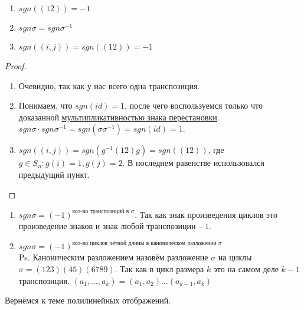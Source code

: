 \begin{statement}\leavevmode
    \begin{enumerate}
        \item $sgn\left((12)\right) = -1$
        \item $sgn\sigma = sgn\sigma^{-1}$    
        \item $sgn\left((i,j)\right) = sgn\left((12)\right) = -1$
    \end{enumerate}
\end{statement}
\begin{proof}\leavevmode
    \begin{enumerate}
        \item Очевидно, так как у нас всего одна транспозиция.
        \item 
            Понимаем, что $sgn(id) = 1$, после чего воспользуемся только что доказанной 
            \hyperref[thm:Мультипликативность знака перестановки]{мультипликативностью знака перестановки}.
            $sgn\sigma\cdot sgn\sigma^{-1} = sgn(\sigma\sigma^{-1}) = sgn(id) = 1$.
        \item
        $sgn\left((i,j)\right) = sgn\left(g^{-1}(12)g\right) = sgn\left((12)\right)$, где $g\in S_n\colon g(i) = 1, g(j) = 2$.
        В последнем равенстве использовался предыдущий пункт.

    \end{enumerate}
\end{proof}
\begin{follow}\leavevmode
    \begin{enumerate}
        \item
            $sgn\sigma = (-1)^{\text{кол-во транспозиций в $\sigma$}}$.
            Так как знак произведения циклов это произведение знаков и знак любой транспозиции $-1$.
        \item
            $sgn\sigma = (-1)^{\text{кол-во циклов чётной длины в каноническом разложении $\sigma$}}$\\
            Ps. Каноническим разложением назовём разложение $\sigma$ на циклы 
            $\sigma =(123)(45)(6789)$.
            Так как в цикл размера $k$ это на самом деле $k - 1$ транспозиция.
            $(a_1,\dots, a_k) = (a_1,a_2)\dots(a_{k-1},a_k)$\\
    \end{enumerate}
\end{follow}
Вернёмся к теме полилинейных отображений.

